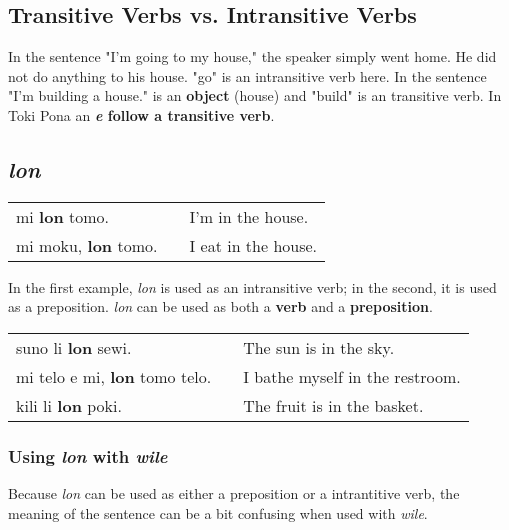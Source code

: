 \subsection*{Transitive Verbs vs. Intransitive Verbs}
%
In the sentence "I'm going to my house," the speaker simply went home.
He did not do anything to his house. 
"go" is an intransitive verb here.
In the sentence "I'm building a house." is an \textbf{object} (house) and "build" is an transitive verb.
In Toki Pona an \textbf{\textit{e} follow a transitive verb}. 
%
\subsection*{\textit{lon}}
%
\begin{supertabular}{p{5,5cm}|ll}
mi \textbf{lon} tomo. && I'm in the house. \\
mi moku, \textbf{lon} tomo. && I eat in the house. \\
\end{supertabular} 

In the first example, \textit{lon} is used as an intransitive verb; in the second, it is used as a preposition. 
\textit{lon} can be used as both a \textbf{verb} and a \textbf{preposition}. 

\begin{supertabular}{p{5,5cm}|ll}
suno li \textbf{lon} sewi. && The sun is in the sky. \\
mi telo e mi, \textbf{lon} tomo telo. && I bathe myself in the restroom. \\
kili li \textbf{lon} poki. && The fruit is in the basket. \\
\end{supertabular} 
%
\subsubsection*{Using \textit{lon} with \textit{wile}}
%
Because \textit{lon} can be used as either a preposition or a intrantitive verb, the meaning of the sentence can be a bit confusing when used with \textit{wile}. 

